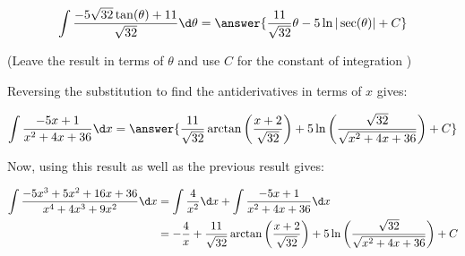 \documentclass{ximera}
\begin{document}
\begin{exercise}
\begin{exercise}
\begin{exercise}
\begin{exercise}
\begin{exercise}
\begin{exercise}
\begin{exercise}
\begin{exercise}
\[
\int   \frac{-5\sqrt{32}\tan(\theta)+11}{\sqrt{32}}  \d \theta = \answer{\frac{11}{\sqrt{32}}\theta -5\ln|\sec(\theta)|+C}
\]

(Leave the result in terms of $\theta$ and use $C$ for the constant of integration )

\begin{exercise}

Reversing the substitution to find the antiderivatives in terms of $x$ gives:

\[\int \frac{-5x+1}{x^{2}+4x+36} \d x =\answer{\frac{11}{\sqrt{32}}\arctan\left(\frac{x+2}{\sqrt{32}}\right)
+ 5\ln\left(\frac{\sqrt{32}}{\sqrt{x^{2}+4x+36}}\right) + C}
\]

\begin{exercise}

Now, using this result as well as the previous result gives:

\begin{align*}
\int \frac{-5x^{3}+5x^{2}+16x+36}{x^{4}+4x^{3}+9x^{2}} \d x &= \int \frac{4}{x^{2}} \d x + \int \frac{-5x+1}{x^{2}+4x+36} \d x \\
&=-\frac{4}{x}+\frac{11}{\sqrt{32}}\arctan\left(\frac{x+2}{\sqrt{32}}\right) + 5\ln\left(\frac{\sqrt{32}}{\sqrt{x^{2}+4x+36}}\right) + C
\end{align*}

 

\end{exercise}
\end{exercise}
\end{exercise}
\end{exercise}
\end{exercise} 
\end{exercise}
\end{exercise}
\end{exercise}
\end{exercise}
\end{exercise}
\end{document}
